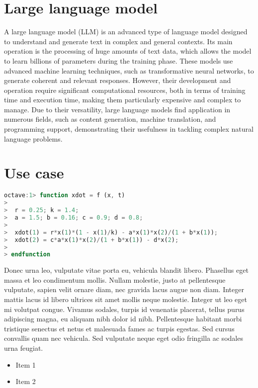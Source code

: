 \section{Large language model}
A large language model (LLM) is an advanced type of language model designed to understand and generate text in complex and general contexts.
Its main operation is the processing of huge amounts of text data, which allows the model to learn billions of parameters during the training phase.
These models use advanced machine learning techniques, such as transformative neural networks, to generate coherent and relevant responses. 
However, their development and operation require significant computational resources, 
both in terms of training time and execution time, making them particularly expensive and complex to manage.
Due to their versatility, large language models find application in numerous fields, such as content generation, machine translation, and programming support, demonstrating their usefulness in tackling complex natural language problems.

\section{Use case}
\begin{lstlisting}[language=octave]
octave:1> function xdot = f (x, t)
>
>  r = 0.25; k = 1.4;
>  a = 1.5; b = 0.16; c = 0.9; d = 0.8;
>
>  xdot(1) = r*x(1)*(1 - x(1)/k) - a*x(1)*x(2)/(1 + b*x(1));
>  xdot(2) = c*a*x(1)*x(2)/(1 + b*x(1)) - d*x(2);
>
> endfunction
\end{lstlisting}


Donec urna leo, vulputate vitae porta eu, vehicula blandit libero. Phasellus eget massa et leo condimentum mollis. Nullam molestie, justo at pellentesque vulputate, sapien velit ornare diam, nec gravida lacus augue non diam. Integer mattis lacus id libero ultrices sit amet mollis neque molestie. Integer ut leo eget mi volutpat congue. Vivamus sodales, turpis id venenatis placerat, tellus purus adipiscing magna, eu aliquam nibh dolor id nibh. Pellentesque habitant morbi tristique senectus et netus et malesuada fames ac turpis egestas. Sed cursus convallis quam nec vehicula. Sed vulputate neque eget odio fringilla ac sodales urna feugiat.

\begin{itemize}
    \item Item 1
    \item Item 2
\end{itemize}

